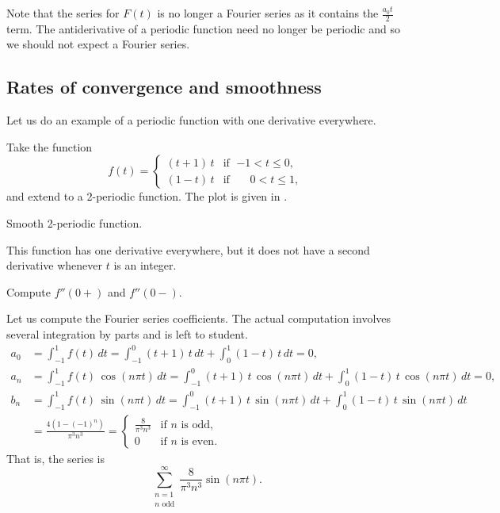 Note that the series for $F(t)$ is no longer a Fourier series as it contains
the $\frac{a_0 t}{2}$ term.  The antiderivative
of a periodic function need no longer be periodic and so we should not
expect a Fourier series.

\subsection{Rates of convergence and smoothness}

Let us do an example of a periodic function with one derivative everywhere.

\begin{example}
Take the function
\begin{equation*}
f(t) =
\begin{cases}
(t+1)\,t & \text{if } \; {-1} < t \leq 0 , \\
(1-t)\,t & \text{if } \; \phantom{-}0 < t \leq 1 ,
\end{cases}
\end{equation*}
and extend to a
2-periodic function.  The plot is given in
.

\begin{myfig}
\capstart
{}
\caption{Smooth 2-periodic function.\label{gfs:smoothexfig}}
\end{myfig}

This function has one derivative everywhere, but it
does not have a second derivative whenever $t$ is an integer.

\begin{exercise}
Compute $f''(0+)$ and $f''(0-)$.
\end{exercise}

Let us compute the Fourier series coefficients.  The actual computation
involves several integration by parts and is left to student.
\begin{align*}
a_0 & = 
\int_{-1}^1
f(t) \, dt = 
\int_{-1}^0
(t+1)\,t \, dt +
\int_0^1
(1-t)\,t \, dt = 0 , \\
a_n & = 
\int_{-1}^1
f(t) \, \cos (n\pi t) \, dt = 
\int_{-1}^0
(t+1)\,t
\, \cos (n \pi t) \, dt +
\int_0^1
(1-t)\,t
\, \cos (n \pi t) \, dt = 0, \\
b_n & = 
\int_{-1}^1
f(t) \, \sin (n\pi t) \, dt = 
\int_{-1}^0
(t+1)\,t
\, \sin (n \pi t) \, dt +
\int_0^1
(1-t)\,t
\, \sin (n \pi t) \, dt \\
& =
\frac{4 ( 1-{(-1)}^n)}{\pi^3 n^3} 
=
\begin{cases}
\frac{8}{\pi^3 n^3} & \text{if } n \text{ is odd} , \\
0 & \text{if } n \text{ is even} .
\end{cases}
\end{align*}
That is, the series is
\begin{equation*}
\sum_{\substack{n=1 \\ n \text{ odd}}}^\infty \frac{8}{\pi^3 n^3} \sin (n \pi t) .
\end{equation*}


\end{example}
